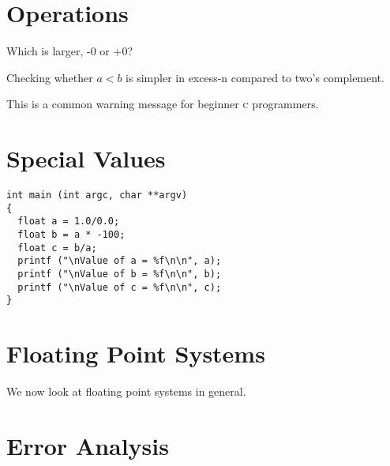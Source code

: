 \frmrule



\section{Operations}

\begin{example}
Which is larger, -0 or +0?
\end{example}





Checking whether $a < b$ is simpler in excess-n compared to two's complement. 


This is a common warning message for beginner \textsc{c} programmers. 




\section{Special Values}




\begin{lstlisting}
int main (int argc, char **argv) 
{ 
  float a = 1.0/0.0; 
  float b = a * -100; 
  float c = b/a; 
  printf ("\nValue of a = %f\n\n", a); 
  printf ("\nValue of b = %f\n\n", b); 
  printf ("\nValue of c = %f\n\n", c); 
} 
\end{lstlisting}


\section{Floating Point Systems}

We now look at floating point systems in general.



\section{Error Analysis}







